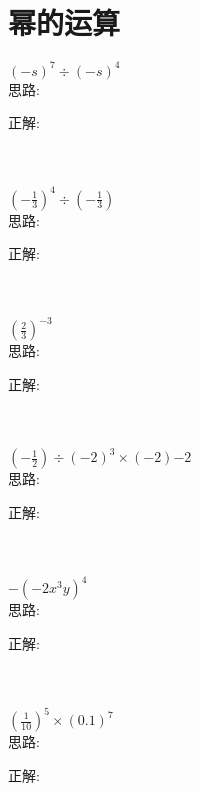\section{幂的运算}

\item {
    $ (-s)^7\div (-s)^4 $ 
    \ifshowSolution
        \fangsong{}
        \\
        思路:

        正解: 
    \else
        \\ \\ \\
    \fi
}

\item {
    $ (-\frac13)^4\div (-\frac13) $ 
    \ifshowSolution
        \fangsong{}
        \\
        思路:

        正解: 
    \else
        \\ \\ \\
    \fi
}

\item {
    $ (\frac23)^{-3} $ 
    \ifshowSolution
        \fangsong{}
        \\
        思路:

        正解: 
    \else
        \\ \\ \\
    \fi
}

\item {
    $ (-\frac12)\div (-2)^{3} \times (-2){-2} $ 
    \ifshowSolution
        \fangsong{}
        \\
        思路:

        正解: 
    \else
        \\ \\ \\
    \fi
}

\item {
    $ -(-2x^3y)^4 $ 
    \ifshowSolution
        \fangsong{}
        \\
        思路:

        正解: 
    \else
        \\ \\ \\
    \fi
}


\item {
    $ (\frac{1}{10})^5 \times (0.1)^7$
    \ifshowSolution
        \fangsong{}
        \\
        思路:

        正解: 
    \else
        \\ \\ \\
    \fi
}

